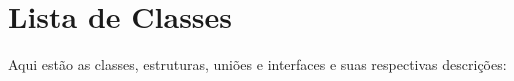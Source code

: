\section{Lista de Classes}
Aqui estão as classes, estruturas, uniões e interfaces e suas respectivas descrições\+:\begin{DoxyCompactList}
\item{}
\end{DoxyCompactList}
